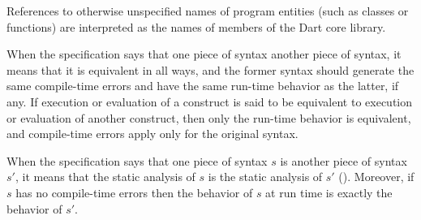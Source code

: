 \documentclass[makeidx]{article}
\begin{document}
\LMHash{}%
References to otherwise unspecified names of program entities
(such as classes or functions)
are interpreted as the names of members of the Dart core library.



\LMHash{}%
When the specification says that one piece of syntax 
another piece of syntax, it means that it is equivalent in all ways,
and the former syntax should generate the same compile-time errors
and have the same run-time behavior as the latter, if any.
If execution or evaluation of a construct is said to be
equivalent to execution or evaluation of another construct,
then only the run-time behavior is equivalent,
and compile-time errors apply only for the original syntax.

\LMHash{}%
%
When the specification says that one piece of syntax $s$ is
another piece of syntax $s'$,
it means that the static analysis of $s$ is the static analysis of $s'$
().
Moreover, if $s$ has no compile-time errors then
the behavior of $s$ at run time is exactly the behavior of $s'$.


\end{document}
